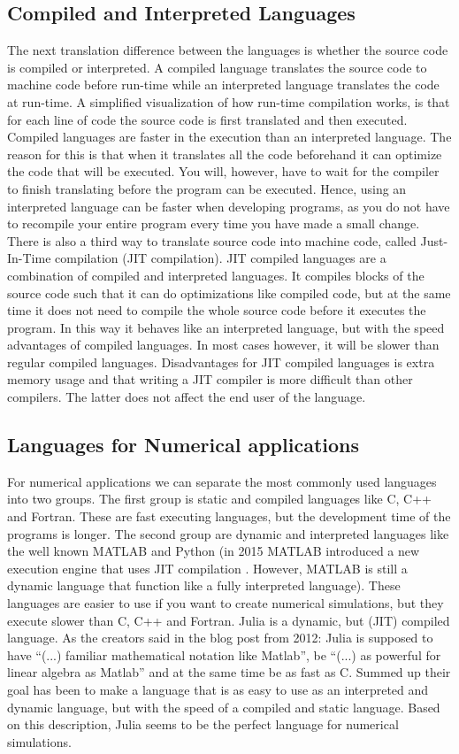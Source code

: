 \subsection{Compiled and Interpreted Languages}
The next translation difference between the languages is whether the source code is compiled or interpreted. A compiled language translates the source code to machine code before run-time while an interpreted language translates the code at run-time. A simplified visualization of how run-time compilation works, is that for each line of code the source code is first translated and then executed. Compiled languages are faster in the execution than an interpreted language. The reason for this is that when it translates all the code beforehand it can optimize the code that will be executed. You will, however, have to wait for the compiler to finish translating before the program can be executed. Hence, using an interpreted language can be faster when developing programs, as you do not have to recompile your entire program every time you have made a small change. There is also a third way to translate source code into machine code, called Just-In-Time compilation (JIT compilation). JIT compiled languages are a combination of compiled and interpreted languages. It compiles blocks of the source code such that it can do optimizations like compiled code, but at the same time it does not need to compile the whole source code before it executes the program. In this way it behaves like an interpreted language, but with the speed advantages of compiled languages. In most cases however, it will be slower than regular compiled languages. Disadvantages for JIT compiled languages is extra memory usage and that writing a JIT compiler is more difficult than other compilers. The latter does not affect the end user of the language.

\subsection{Languages for Numerical applications}
\label{sec:numericalLang}
For numerical applications we can separate the most commonly used languages into two groups. The first group is static and compiled languages like C, C++ and Fortran. These are fast executing languages, but the development time of the programs is longer. The second group are dynamic and interpreted languages like the well known MATLAB and Python (in 2015 MATLAB introduced a new execution engine that uses JIT compilation \citep{MatlabJIT}. However, MATLAB is still a dynamic language that function like a fully interpreted language). These languages are easier to use if you want to create numerical simulations, but they execute slower than C, C++ and Fortran. Julia is a dynamic, but (JIT) compiled language. As the creators said in the blog post from 2012: Julia is supposed to have \enquote{(...) familiar mathematical notation like Matlab}, be \enquote{(...) as  powerful  for  linear  algebra  as Matlab} and at the same time be as fast as C. Summed up their goal has been to make a language that is as easy to use as an interpreted and dynamic language, but with the speed of a compiled and static language. Based on this description, Julia seems to be the perfect language for numerical simulations.

